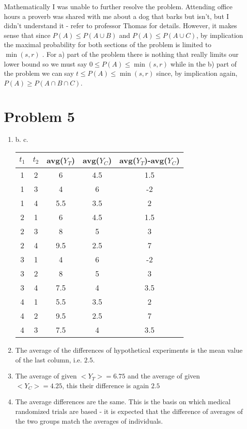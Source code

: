 \documentclass{article}
\newcommand{\1}{\mathbf{1}}
\begin{document}
Mathematically I was unable to further resolve the problem. Attending office hours a proverb was shared with me about a dog that barks but isn't, but I didn't understand it - refer to professor Thomas for details. However, it makes sense that since  $P(A) \leq P(A\cup B)$ and $P(A) \leq P(A\cup C)$, by implication the maximal probability for both sections of the problem is limited to $\min{(s, r)}$ . For a) part of the problem there is nothing that really limits our lower bound so we must say $0 \leq P(A) \leq \min{(s, r)}$ while in the b) part of the problem we can say $t \leq P(A) \leq \min{(s, r)}$ since, by implication again, $P(A)\geq P(A\cap B\cap C)$.

\newpage
\section*{Problem 5}
\begin{enumerate}
	\item \addtocounter{enumi}{3} b. c. \begin{table}[h]
            \begin{tabular}{cc|c|c|c}
            $t_1$ & $t_2$  & avg($Y_T$) & avg($Y_C$) & avg($Y_T$)-avg($Y_C$)\\ \hline
            1 & 2 & 6   & 4.5 & 1.5 \\
            1 & 3 & 4   & 6   & -2 \\
            1 & 4 & 5.5 & 3.5 & 2 \\ 
            2 & 1 & 6   & 4.5 & 1.5 \\
            2 & 3 & 8   & 5   & 3 \\
            2 & 4 & 9.5 & 2.5 & 7 \\
            3 & 1 & 4   & 6   & -2 \\
            3 & 2 & 8   & 5   & 3 \\
            3 & 4 & 7.5 & 4   & 3.5 \\
            4 & 1 & 5.5 & 3.5 & 2 \\
            4 & 2 & 9.5 & 2.5 & 7 \\
            4 & 3 & 7.5 & 4 & 3.5
            \end{tabular}
        \end{table}
    \item The average of the differences of hypothetical experiments is the mean value of the last column, i.e. $2.5$.
    \item The average of given $<Y_T>=6.75$ and the average of given $<Y_C>=4.25$, this their difference is again $2.5$
    \item The average differences are the same. This is the basis on which medical randomized trials are based - it is expected that the difference of averages of the two groups match the averages of individuals.
\end{enumerate}
\end{document}
